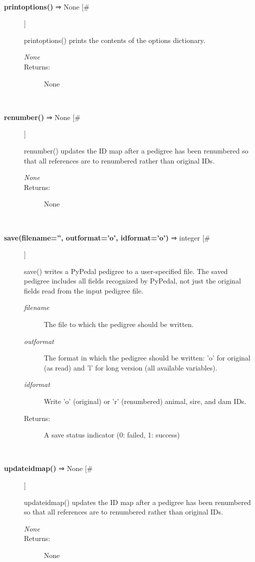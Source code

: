 \begin{description}
\begin{description}
\end{description}
\\ 

\item[\textbf{printoptions()}
 ⇒ None [\#]]

 printoptions() prints the contents of the options dictionary.
\begin{description}
\item[\emph{None}
]
\item[Returns:] None

\end{description}
\\ 

\item[\textbf{renumber()}
 ⇒ None [\#]]

 renumber() updates the ID map after a pedigree has been renumbered so that all references are to renumbered rather than original IDs.
\begin{description}
\item[\emph{None}
]
\item[Returns:] None

\end{description}
\\ 

\item[\textbf{save(filename='', outformat='o', idformat='o')}
 ⇒ integer [\#]]

 save() writes a PyPedal pedigree to a user-specified file. The saved pedigree includes all fields recognized by PyPedal, not just the original fields read from the input pedigree file.
\begin{description}
\item[\emph{filename}
] The file to which the pedigree should be written.
\item[\emph{outformat}
] The format in which the pedigree should be written: 'o' for original (as read) and 'l' for long version (all available variables).
\item[\emph{idformat}
] Write 'o' (original) or 'r' (renumbered) animal, sire, and dam IDs.
\item[Returns:] A save status indicator (0: failed, 1: success)

\end{description}
\\ 

\item[\textbf{updateidmap()}
 ⇒ None [\#]]

 updateidmap() updates the ID map after a pedigree has been renumbered so that all references are to renumbered rather than original IDs.
\begin{description}
\item[\emph{None}
]
\item[Returns:] None

\end{description}
\\ 


\end{description}
